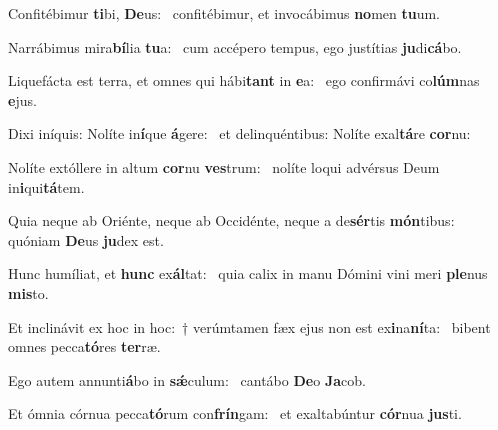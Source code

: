 \item Confitébimur \textbf{ti}bi, \textbf{De}us:~\psstar{} confitébimur, et invocábimus \textbf{no}men \textbf{tu}um.
\item Narrábimus mira\textbf{bí}lia \textbf{tu}a:~\psstar{} cum accépero tempus, ego justítias \textbf{ju}di\textbf{cá}bo.
\item Liquefácta est terra, et omnes qui hábi\textbf{tant} in \textbf{e}a:~\psstar{} ego confirmávi co\textbf{lúm}nas \textbf{e}jus.
\item Dixi iníquis: Nolíte in\textbf{í}que \textbf{á}gere:~\psstar{} et delinquéntibus: Nolíte exal\textbf{tá}re \textbf{cor}nu:
\item Nolíte extóllere in altum \textbf{cor}nu \textbf{ves}trum:~\psstar{} nolíte loqui advérsus Deum in\textbf{i}qui\textbf{tá}tem.
\item Quia neque ab Oriénte, neque ab Occidénte, neque a de\textbf{sér}tis \textbf{món}tibus:~\psstar{} quóniam \textbf{De}us \textbf{ju}dex est.
\item Hunc humíliat, et \textbf{hunc} ex\textbf{ál}tat:~\psstar{} quia calix in manu Dómini vini meri \textbf{ple}nus \textbf{mis}to.
\item Et inclinávit ex hoc in hoc:~† verúmtamen fæx ejus non est ex\textbf{i}na\textbf{ní}ta:~\psstar{} bibent omnes pecca\textbf{tó}res \textbf{ter}ræ.
\item Ego autem annunti\textbf{á}bo in \textbf{sǽ}culum:~\psstar{} cantábo \textbf{De}o \textbf{Ja}cob.
\item Et ómnia córnua pecca\textbf{tó}rum con\textbf{frín}gam:~\psstar{} et exaltabúntur \textbf{cór}nua \textbf{jus}ti.
